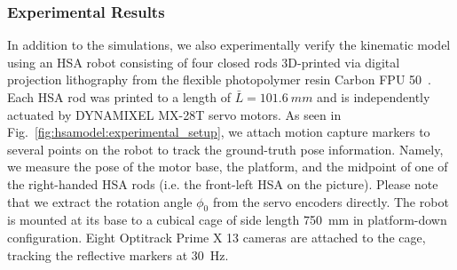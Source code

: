     

\subsubsection{Experimental Results}\label{ssub:hsamodel:hsa_rod_kinematics:experimental_results}
In addition to the simulations, we also experimentally verify the kinematic model using an \gls{HSA} robot consisting of four closed rods 3D-printed via digital projection lithography from the flexible photopolymer resin Carbon FPU 50~\citep{truby2021recipe}. Each \gls{HSA} rod was printed to a length of $\bar{L} = \SI{101.6}{mm}$ and is independently actuated by DYNAMIXEL MX-28T servo motors.
As seen in Fig.~\ref{fig:hsamodel:experimental_setup}, we attach motion capture markers to several points on the robot to track the ground-truth pose information. Namely, we measure the pose of the motor base, the platform, and the midpoint of one of the right-handed \gls{HSA} rods (i.e. the front-left \gls{HSA} on the picture). Please note that we extract the rotation angle $\phi_0$ from the servo encoders directly. The robot is mounted at its base to a cubical cage of side length \SI{750}{mm} in platform-down configuration. Eight Optitrack Prime X 13 cameras are attached to the cage, tracking the reflective markers at \SI{30}{Hz}.

